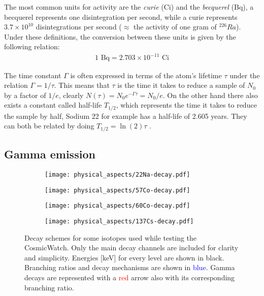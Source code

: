 The most common units for activity are the \textit{curie} (Ci) and the \textit{becquerel} (Bq), a becquerel represents one disintegration per second, while a curie represents $3.7\times10^{10}$ disintegrations per second ($\approx$ the activity of one gram of $^{226}Ra$). Under these definitions, the conversion between these units is given by the following relation:
\begin{eqnarray}
    1 \text{~Bq} = 2.703\times10^{-11} \text{~Ci}
\end{eqnarray}

The time constant $\Gamma$ is often expressed in terms of the atom's lifetime $\tau$ under the relation $\Gamma=1/\tau$. This means that $\tau$ is the time it takes to reduce a sample of $N_0$ by a factor of $1/e$, clearly $N(\tau)=N_0e^{-\Gamma \tau} = N_0/e$. On the other hand there also exists a constant called half-life $T_{1/2}$, which represents the time it takes to reduce the sample by half, Sodium 22 for example has a half-life of 2.605 years. They can both be related by doing $T_{1/2} = \ln (2)\tau$ \cite{knoll2010radiation}.

\subsection{Gamma emission}

\begin{figure}
  \centering
  \begin{subfigure}[t]{0.45\textwidth}
    \texttt{[image: physical\_aspects/22Na-decay.pdf]}
    \caption{\label{sfig:22Na}}
  \end{subfigure}
  \begin{subfigure}[t]{0.425\textwidth}
    \texttt{[image: physical\_aspects/57Co-decay.pdf]}
    \caption{\label{sfig:57Co}}
  \end{subfigure}
  \medskip
  \centering
  \begin{subfigure}[t]{0.425\textwidth}
    \texttt{[image: physical\_aspects/60Co-decay.pdf]}
    \caption{\label{sfig:60Co}}
  \end{subfigure}
  \begin{subfigure}[t]{0.425\textwidth}
    \texttt{[image: physical\_aspects/137Cs-decay.pdf]}
    \caption{\label{sfig:137Cs}}
  \end{subfigure}
  \caption{\label{fig:decay_schemes}Decay schemes for some isotopes used while testing the CosmicWatch. Only the main decay channels are included for clarity and simplicity. Energies [\unit{\kilo\eV}] for every level are shown in black. Branching ratios and decay mechanisms are shown in \textcolor{blue}{blue}. Gamma decays are represented with a \textcolor{red}{red} arrow also with its corresponding branching ratio.}
\end{figure}

